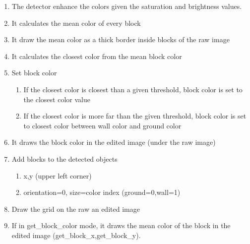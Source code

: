     \begin{enumerate}
        \item The detector enhance the colors given the saturation and 
            brightness values.
        \item It calculates the mean color of every block
        \item It draw the mean color as a thick border inside blocks of 
            the raw image
        \item It calculates the closest color from the mean block color
        \item Set block color
        \begin{enumerate}
            \item If the closest color is closest than a given threshold, 
                block color is set to the closest color value
            \item If the closest color is more far than the given 
                threshold, block color is set to closest color between 
                wall color and ground color
        \end{enumerate}
        \item It draws the block color in the edited image (under the 
            raw image)
        \item Add blocks to the detected objects
        \begin{enumerate}
            \item x,y (upper left corner)
            \item orientation=0, size=color index (ground=0,wall=1)
        \end{enumerate}
        \item Draw the grid on the raw an edited image
       \item If in get\_block\_color mode, it draws the mean color of 
            the block in the edited image (get\_block\_x,get\_block\_y).
 
    \end{enumerate}

